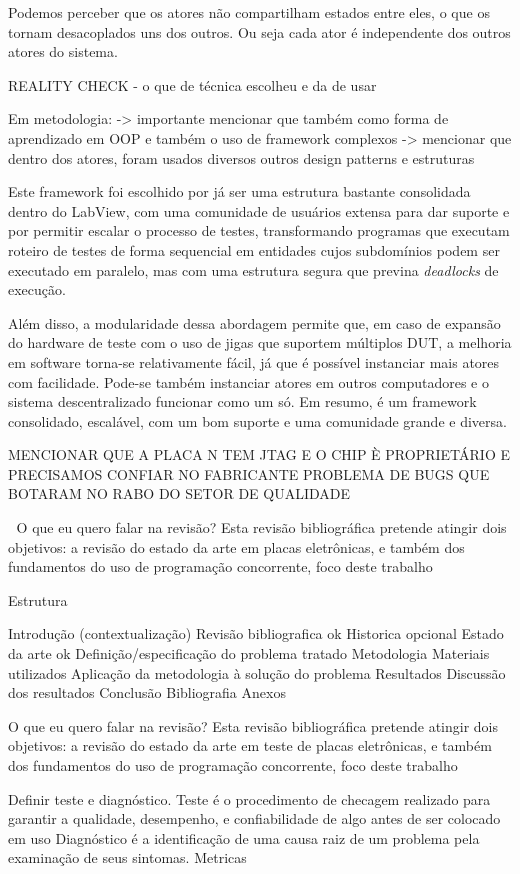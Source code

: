                 Podemos perceber que os atores não compartilham estados entre eles, o que os tornam desacoplados uns dos outros. Ou seja cada ator é independente dos outros atores do sistema.
                



REALITY CHECK - o que de técnica escolheu e da de usar

Em metodologia:
-> importante mencionar que também como forma de aprendizado em OOP e também o uso de framework complexos 
-> mencionar que dentro dos atores, foram usados diversos outros design patterns e estruturas


            Este framework foi escolhido por já ser uma estrutura bastante consolidada dentro do LabView, com uma comunidade de usuários extensa para dar suporte e por permitir escalar o processo de testes, transformando programas que executam roteiro de testes de forma sequencial em entidades cujos subdomínios podem ser executado em paralelo, mas com uma estrutura segura que previna \textit{deadlocks} de execução.
            
            Além disso, a modularidade dessa abordagem permite que, em caso de expansão do hardware de teste com o uso de jigas que suportem múltiplos DUT, a melhoria em software torna-se relativamente fácil, já que é possível instanciar mais atores com facilidade. Pode-se também instanciar atores em outros computadores e o sistema descentralizado funcionar como um só.
            Em resumo, é um framework consolidado, escalável, com um bom suporte e uma comunidade grande e diversa.



MENCIONAR QUE A PLACA N TEM JTAG E O CHIP È PROPRIETÁRIO E PRECISAMOS CONFIAR NO FABRICANTE
PROBLEMA DE BUGS QUE BOTARAM NO RABO DO SETOR DE QUALIDADE





O que eu quero falar na revisão?
Esta revisão bibliográfica pretende atingir dois objetivos: a revisão do estado da arte em placas eletrônicas, e também dos fundamentos do uso de programação concorrente, foco deste trabalho

Estrutura

Introdução (contextualização)
Revisão bibliografica ok
	Historica opcional
	Estado da arte ok
Definição/especificação do problema tratado
Metodologia
Materiais utilizados
Aplicação da metodologia à solução do problema
Resultados
Discussão dos resultados
Conclusão
Bibliografia
Anexos

O que eu quero falar na revisão?
Esta revisão bibliográfica pretende atingir dois objetivos: a revisão do estado da arte em teste de  placas eletrônicas, e também dos fundamentos do uso de programação concorrente, foco deste trabalho


Definir teste e diagnóstico.
Teste é o procedimento de checagem realizado para garantir a qualidade, desempenho, e confiabilidade de algo antes de ser colocado em uso
Diagnóstico é a identificação de uma causa raiz de um problema pela examinação de seus sintomas.
Metricas



